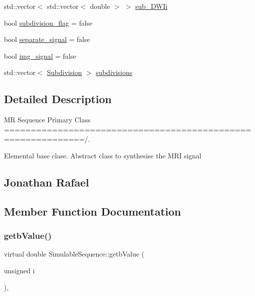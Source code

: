 \begin{DoxyCompactItemize}
\item 
std\+::vector$<$ std\+::vector$<$ double $>$ $>$ \hyperlink{class_simulable_sequence_a1e958cc7d15337fa3ae0e58c8330f212}{sub\+\_\+\+D\+W\+Ii}
\item 
bool \hyperlink{class_simulable_sequence_ae9e6e581ba16bbf81b693c0e4943bbf9}{subdivision\+\_\+flag} = false
\item 
bool \hyperlink{class_simulable_sequence_a3278d9b5b22b0bfbdd0ce4bef0e1cc85}{separate\+\_\+signal} = false
\item 
bool \hyperlink{class_simulable_sequence_a7603177060550acd31ece2c87fcdd2a9}{img\+\_\+signal} = false
\item 
std\+::vector$<$ \hyperlink{class_subdivision}{Subdivision} $>$ \hyperlink{class_simulable_sequence_a77c721d4650578fdc3f44adfa91c030e}{subdivisions}
\end{DoxyCompactItemize}


\subsection{Detailed Description}
MR Sequence Primary Class =============================================================/. 

Elemental base clase. Abstract class to synthesise the M\+RI signal

\subsection*{Jonathan Rafael }

\subsection{Member Function Documentation}
\mbox{\label{class_simulable_sequence_a85cdcf5f7bd5bed804a816e3c18840b7}} 
\subsubsection{\texorpdfstring{getb\+Value()}{getbValue()}}
{\footnotesize\ttfamily virtual double Simulable\+Sequence\+::getb\+Value (\begin{DoxyParamCaption}\item[{unsigned}]{i }\end{DoxyParamCaption})\hspace{0.3cm}{\ttfamily [inline]}, {\ttfamily [virtual]}}


